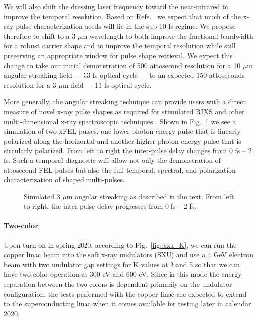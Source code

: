 We will also shift the dressing laser frequency toward the near-infrared to improve the temporal resolution.
Based on Refs.~\cite{lcls2_opportunities,Biggs2012,Mukamel2013} we expect that much of the x-ray pulse characterization needs will lie in the sub-10 fs regime.
We propose therefore to shift to a 3 $\mu$m wavelength to both improve the fractional bandwidth for a robust carrier shape and to improve the temporal resolution while still preserving an appropriate window for pulse shape retrieval.
We expect this change to take our initial demonstration of 500 attosecond resolution for a 10 $\mu$m angular streaking field --- 33 fs optical cycle --- to an expected 150 attoseconds resolution for a 3 $\mu$m field --- 11 fs optical cycle.

More generally, the angular streaking technique can provide users with a direct measure of novel x-ray pulse shapes as required for stimulated RIXS and other multi-dimensional x-ray spectroscopic techniques \cite{Biggs2012,Mukamel2013,4WaveMixing}.
Shown in Fig.~\ref{coffeestains} we see a simulation of two xFEL pulses, one lower photon energy pulse that is linearly polarized along the horizontal and another higher photon energy pulse that is circularly polarized.
From left to right the inter-pulse delay changes from 0 fs -- 2 fs.
Such a temporal diagnostic will allow not only the demonstration of attosecond FEL pulses but also the full temporal, spectral, and polarization characterization of shaped multi-pulses.

\begin{figure}[b]
\vspace{-1.5\baselineskip}
\centerline{
}
\vspace{-1.0\baselineskip}
\caption{\label{coffeestains} Simulated 3 $\mu$m angular streaking as described in the text. From left to right, the inter-pulse delay progresses from 0 fs -- 2 fs.}
\end{figure}


\paragraph{Two-color}
Upon turn on in spring 2020, according to Fig.~\ref{fig::sxu_K}, we can run the copper linac beam into the soft x-ray undulators (SXU) and use a 4 GeV electron beam with two undulator gap settings for K values at 2 and 5 so that we can have two color operation at 300 eV and 600 eV. 
Since in this mode the energy separation between the two colors is dependent primarily on the undulator configuration, the tests performed with the copper linac are expected to extend to the superconducting linac when it comes available for testing later in calendar 2020.

